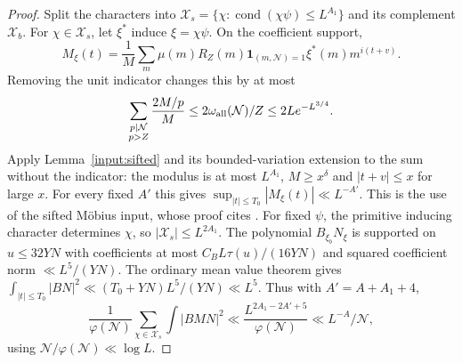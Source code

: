 \documentclass[11pt]{article}
\theoremstyle{definition}
\newcommand{\ind}{\mathbf 1}
\newcommand{\ph}{\varphi}
\DeclareMathOperator{\cond}{cond}
\newcommand{\GN}{\mathcal N}
\theoremstyle{remark}
\numberwithin{equation}{section}
\begin{document}
\begin{proof}
Split the characters into
$\mathcal X_s=\{\chi:\cond(\chi\psi)\le L^{A_1}\}$ and its
complement $\mathcal X_b$.
For $\chi\in\mathcal X_s$, let $\xi^*$ induce $\xi=\chi\psi$.
On the coefficient support,
\begin{equation}\label{eq:small-conductor-M}
 M_\xi(t)=\frac1M\sum_m\mu(m)R_Z(m)\ind_{(m,\GN)=1}
                    \xi^*(m)m^{i(t+v)}.
\end{equation}
Removing the unit indicator changes this by at most
\[
 \sum_{\substack{p\mid\GN\\p>Z}}\frac{2M/p}{M}
 \le2\omega_{\rm all}(\GN)/Z\le2Le^{-L^{3/4}}.
\]
Apply Lemma~\ref{input:sifted} and its bounded-variation extension to the
sum without the indicator: the modulus is at most $L^{A_1}$,
$M\ge x^\delta$ and $|t+v|\le x$ for large $x$.
For every fixed $A'$ this gives
$\sup_{|t|\le T_0}|M_\xi(t)|\ll L^{-A'}$.
This is the use of the sifted M\"obius input, whose proof cites
\cite[Lemma~3.9(ii)]{MSTT}.
For fixed $\psi$, the primitive inducing character determines
$\chi$, so $|\mathcal X_s|\le L^{2A_1}$.
The polynomial $B_{\xi_b}N_\xi$ is supported on $u\le32YN$ with
coefficients at most $C_BL\tau(u)/(16YN)$ and squared coefficient
norm $\ll L^5/(YN)$. The ordinary mean value theorem gives
$\int_{|t|\le T_0}|BN|^2\ll(T_0+YN)L^5/(YN)\ll L^5$.
Thus with $A'=A+A_1+4$,
\begin{equation}\label{eq:small-conductor-energy}
 \frac1{\ph(\GN)}\sum_{\chi\in\mathcal X_s}\int|BMN|^2
 \ll\frac{L^{2A_1-2A'+5}}{\ph(\GN)}
 \ll L^{-A}/\GN,
\end{equation}
using $\GN/\ph(\GN)\ll\log L$.


\end{proof}
\end{document}
